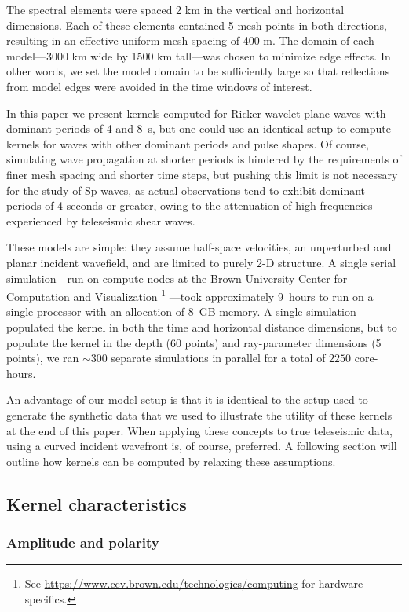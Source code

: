 \documentclass[referee]{gji}
\begin{document}
The spectral elements were spaced 2 km in the vertical and horizontal dimensions.  Each of these elements contained 5 mesh points in both directions, resulting in an effective uniform mesh spacing of 400 m.  The domain of each model---3000 km wide by 1500 km tall---was chosen to minimize edge effects.  In other words, we set the model domain to be sufficiently large so that reflections from model edges were avoided in the time windows of interest.

In this paper we present kernels computed for Ricker-wavelet plane waves with dominant periods of 4 and 8~s, but one could use an identical setup to compute kernels for waves with other dominant periods and pulse shapes.  Of course, simulating wave propagation at shorter periods is hindered by the requirements of finer mesh spacing and shorter time steps, but pushing this limit is not necessary for the study of Sp waves, as actual observations tend to exhibit dominant periods of 4 seconds or greater, owing to the attenuation of high-frequencies experienced by teleseismic shear waves.

These models are simple: they assume half-space velocities, an unperturbed and planar incident wavefield, and are limited to purely 2-D structure.   A single serial simulation---run on compute nodes at the Brown University Center for Computation and Visualization
\footnote{See \url{https://www.ccv.brown.edu/technologies/computing}
for hardware specifics.}
---took approximately 9~hours to run on a single processor with an allocation of 8~GB memory.
A single simulation populated the kernel in both the time and horizontal distance dimensions, but to populate the kernel in the depth (60 points) and ray-parameter dimensions (5 points), we ran $\sim 300$ separate simulations in parallel for a total of $2250$ core-hours.

An advantage of our model setup is that it is identical to the setup used to generate the synthetic data that we used to illustrate the utility of these kernels at the end of this paper.  When applying these concepts to true teleseismic data, using a curved incident wavefront is, of course, preferred.  A following section will outline how kernels can be computed by relaxing these assumptions.

\subsection{Kernel characteristics}

\subsubsection{Amplitude and polarity}
\end{document}
